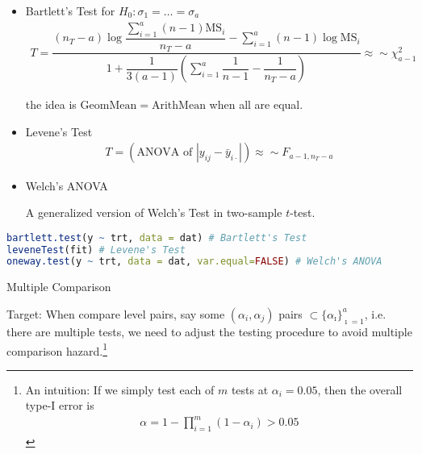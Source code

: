 \begin{itemize}[topsep=2pt,itemsep=0pt]
    \item Bartlett's Test for $ H_0:\sigma _1=\ldots=\sigma _a $
    \begin{align}
        T=\dfrac{ (n_T-a)\log\dfrac{\sum_{i=1}^a (n-1)\mathrm{ MS }_i  }{ n_T-a } -\sum_{i=1}^a(n-1)\log \mathrm{MS}_i   }{ 1+\dfrac{ 1 }{ 3(a-1) }\left(\sum_{i=1}^a\dfrac{ 1 }{ n-1 }-\dfrac{ 1 }{ n_T-a }  \right)  }\approx \sim \chi^2_{a-1}  
    \end{align}

    the idea is $ \mathrm{ GeomMean }=\mathrm{ ArithMean }   $ when all are equal.
    
    
    \item Levene's Test
    \begin{align}
        T=(\text{ANOVA of }|y_{ij}-\bar{y}_{i\cdot }|)\approx \sim F_{a-1,n_T-a}
    \end{align}
    
    \item Welch's ANOVA
    
    A generalized version of Welch's Test in two-sample $ t $-test.   
    
\end{itemize}


\begin{rcode}
\begin{lstlisting}[language=R]
bartlett.test(y ~ trt, data = dat) # Bartlett's Test
leveneTest(fit) # Levene's Test
oneway.test(y ~ trt, data = dat, var.equal=FALSE) # Welch's ANOVA
\end{lstlisting}
\end{rcode}

\begin{point}
    \hypertarget{DoEMultipleComparison}{Multiple Comparison}
\end{point}

Target: When compare level pairs, say some $ (\alpha _i, \alpha _j) $ pairs $ \subset \{\alpha _\imath\}_{\imath=1}^a $, i.e. there are multiple tests, we need to adjust the testing procedure to avoid multiple comparison hazard.\footnote{An intuition: If we simply test each of $ m $ tests at $ \alpha_i = 0.05 $, then the overall type-I error is 
\begin{align}
    \alpha = 1-\prod_{i=1}^m(1-\alpha _i)>0.05
\end{align}
}

